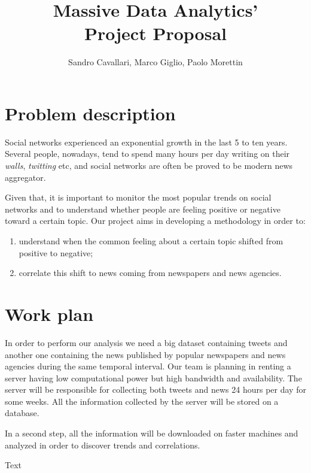 \documentclass[a4paper]{article}
\begin{document}
\title{Massive Data Analytics'\\Project Proposal}
\author{Sandro Cavallari, Marco Giglio, Paolo Morettin}
\maketitle

\section{Problem description}
Social networks experienced an exponential growth in the last 5 to ten years.
Several people, nowadays, tend to spend many hours per day writing on their
\emph{walls}, \emph{twitting} etc, and social networks are often be proved to be
modern news aggregator.

Given that, it is important to monitor the most popular trends on social
networks and to understand whether people are feeling positive or negative
toward a certain topic. Our project aims in developing a methodology in order
to:
\begin{enumerate}
\item understand when the common feeling about a certain topic shifted from positive
to negative;
\item correlate this shift to news coming from newspapers and news agencies.
\end{enumerate}

\section{Work plan}
In order to perform our analysis we need a big dataset containing tweets and
another one containing the news published by popular newspapers and news
agencies during the same temporal interval. Our team is planning in renting a
server having low computational power but high bandwidth and availability. The
server will be responsible for collecting both tweets and news 24 hours per day
for some weeks. All the information collected by the server will be stored on a
database.

In a second step, all the information will be downloaded on faster machines and
analyzed in order to discover trends and correlations.

\begin{thebibliography}{9}
\bibitem{}
Text
\end{thebibliography}
\end{document}
